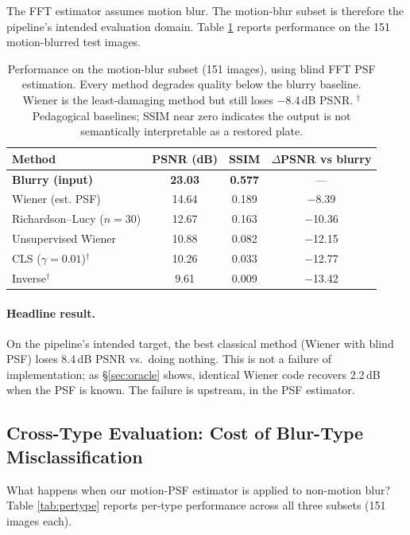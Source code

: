 \documentclass[12pt,a4paper]{article}
\begin{document}
The FFT estimator assumes motion blur. The motion-blur subset is
therefore the pipeline's intended evaluation domain. Table
\ref{tab:motion} reports performance on the 151 motion-blurred test
images.

\begin{table}[H]
\centering
\begin{tabular}{lcc c}
\toprule
\textbf{Method} & \textbf{PSNR (dB)} & \textbf{SSIM} & \textbf{$\Delta$PSNR vs blurry} \\
\midrule
\textbf{Blurry (input)}             & \textbf{23.03} & \textbf{0.577} & --- \\
Wiener (est. PSF)                   & 14.64 & 0.189 & $-$8.39 \\
Richardson--Lucy ($n=30$)           & 12.67 & 0.163 & $-$10.36 \\
Unsupervised Wiener                 & 10.88 & 0.082 & $-$12.15 \\
CLS ($\gamma=0.01$)$^{\dagger}$     & 10.26 & 0.033 & $-$12.77 \\
Inverse$^{\dagger}$                 &  9.61 & 0.009 & $-$13.42 \\
\bottomrule
\end{tabular}
\caption{Performance on the motion-blur subset (151 images), using
blind FFT PSF estimation. Every method degrades quality below the
blurry baseline. Wiener is the least-damaging method but still loses
$-$8.4\,dB PSNR. $^{\dagger}$Pedagogical baselines; SSIM near zero
indicates the output is not semantically interpretable as a restored
plate.}
\label{tab:motion}
\end{table}

\paragraph{Headline result.} On the pipeline's intended target, the best
classical method (Wiener with blind PSF) loses 8.4\,dB PSNR vs.\ doing
nothing. This is not a failure of implementation; as \S\ref{sec:oracle}
shows, identical Wiener code recovers 2.2\,dB when the PSF is known.
The failure is upstream, in the PSF estimator.

\subsection{Cross-Type Evaluation: Cost of Blur-Type Misclassification}
\label{sec:crosstype}

What happens when our motion-PSF estimator is applied to non-motion
blur? Table \ref{tab:pertype} reports per-type performance across all
three subsets (151 images each).
\end{document}
